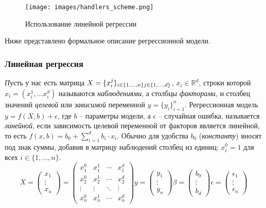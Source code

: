 \documentclass[14pt]{matmex-diploma}
\begin{document}
\begin{figure}[t]
\centering
\texttt{[image: images/handlers\_scheme.png]}
\caption{Использование линейной регрессии}
\label{fig:handlers_scheme}
\end{figure}

\indent Ниже представлено формальное описание регрессионной модели.

\subsubsection{Линейная регрессия}
\indent \textit Пусть у нас есть матрица $X = \{x_i^j\}_{i \in \{1, ..., n\} \\ j \in \{1, ..., d\}}$, $x_i\in\mathbb{R}^{d}$, строки которой $x_i = (x_i^1, ... x_i^d)$ называются \textit{наблюдениями}, а столбцы \textit{факторами}, и столбец значений \textit{целевой} или \textit{зависимой} переменной $y = \{y_i\}_{i=1}^n$. Регрессионная модель $y = f(X, b) + \epsilon$, где $b$ -- параметры модели, а $\epsilon$ -- случайная ошибка, называется \textit{линейной}, если зависимость целевой переменной от факторов является линейной, то есть $f(x, b) = b_0 + \sum_{i=1}^{d} b_i \cdot x_i$. Обычно для удобства $b_0$ (\textit{константу}) вносят под знак суммы, добавив в матрицу наблюдений столбец из единиц: $x_i^0 = 1$ для всех $i \in \{1, ..., n\}$. 
$$X = \left(\begin{array}{c}
      x_1 \\
      \vdots \\
      x_n
    \end{array}
  \right) 
  = 
  \begin{pmatrix} x_1^0 & x_1^1 & \cdots & x_1^d \\
                      x_2^0 & x_2^1 & \cdots & x_2^d \\
                      \vdots & \vdots & \ddots & \vdots \\
                      x_n^0 & x_n^1 & \cdots & x_n^d \end{pmatrix}
y = \left(\begin{array}{c}
      y_1 \\
      \vdots \\
      y_n
    \end{array}
  \right)
\beta = \left(\begin{array}{c}
      b_0 \\
      \vdots \\
      b_d
    \end{array}
  \right)
\epsilon = \left(\begin{array}{c}
      \epsilon_1 \\
      \vdots \\
      \epsilon_n
    \end{array}
  \right)$$
\end{document}
